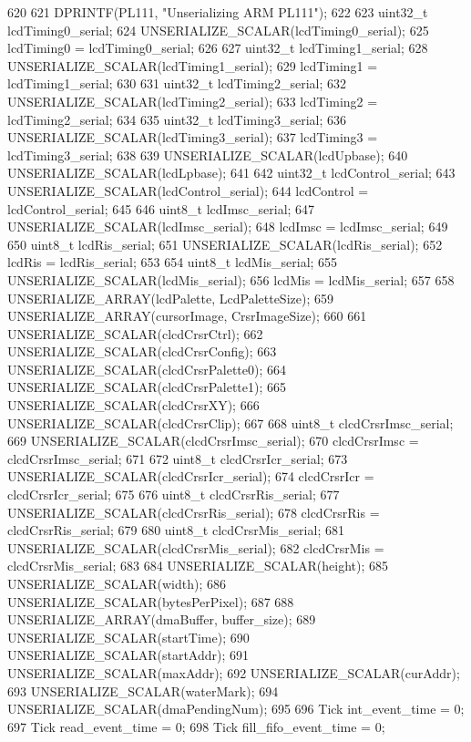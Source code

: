 \begin{DoxyCode}
620 {
621     DPRINTF(PL111, "Unserializing ARM PL111\n");
622 
623     uint32_t lcdTiming0_serial;
624     UNSERIALIZE_SCALAR(lcdTiming0_serial);
625     lcdTiming0 = lcdTiming0_serial;
626 
627     uint32_t lcdTiming1_serial;
628     UNSERIALIZE_SCALAR(lcdTiming1_serial);
629     lcdTiming1 = lcdTiming1_serial;
630 
631     uint32_t lcdTiming2_serial;
632     UNSERIALIZE_SCALAR(lcdTiming2_serial);
633     lcdTiming2 = lcdTiming2_serial;
634 
635     uint32_t lcdTiming3_serial;
636     UNSERIALIZE_SCALAR(lcdTiming3_serial);
637     lcdTiming3 = lcdTiming3_serial;
638 
639     UNSERIALIZE_SCALAR(lcdUpbase);
640     UNSERIALIZE_SCALAR(lcdLpbase);
641 
642     uint32_t lcdControl_serial;
643     UNSERIALIZE_SCALAR(lcdControl_serial);
644     lcdControl = lcdControl_serial;
645 
646     uint8_t lcdImsc_serial;
647     UNSERIALIZE_SCALAR(lcdImsc_serial);
648     lcdImsc = lcdImsc_serial;
649 
650     uint8_t lcdRis_serial;
651     UNSERIALIZE_SCALAR(lcdRis_serial);
652     lcdRis = lcdRis_serial;
653 
654     uint8_t lcdMis_serial;
655     UNSERIALIZE_SCALAR(lcdMis_serial);
656     lcdMis = lcdMis_serial;
657 
658     UNSERIALIZE_ARRAY(lcdPalette, LcdPaletteSize);
659     UNSERIALIZE_ARRAY(cursorImage, CrsrImageSize);
660 
661     UNSERIALIZE_SCALAR(clcdCrsrCtrl);
662     UNSERIALIZE_SCALAR(clcdCrsrConfig);
663     UNSERIALIZE_SCALAR(clcdCrsrPalette0);
664     UNSERIALIZE_SCALAR(clcdCrsrPalette1);
665     UNSERIALIZE_SCALAR(clcdCrsrXY);
666     UNSERIALIZE_SCALAR(clcdCrsrClip);
667 
668     uint8_t clcdCrsrImsc_serial;
669     UNSERIALIZE_SCALAR(clcdCrsrImsc_serial);
670     clcdCrsrImsc = clcdCrsrImsc_serial;
671 
672     uint8_t clcdCrsrIcr_serial;
673     UNSERIALIZE_SCALAR(clcdCrsrIcr_serial);
674     clcdCrsrIcr = clcdCrsrIcr_serial;
675 
676     uint8_t clcdCrsrRis_serial;
677     UNSERIALIZE_SCALAR(clcdCrsrRis_serial);
678     clcdCrsrRis = clcdCrsrRis_serial;
679 
680     uint8_t clcdCrsrMis_serial;
681     UNSERIALIZE_SCALAR(clcdCrsrMis_serial);
682     clcdCrsrMis = clcdCrsrMis_serial;
683 
684     UNSERIALIZE_SCALAR(height);
685     UNSERIALIZE_SCALAR(width);
686     UNSERIALIZE_SCALAR(bytesPerPixel);
687 
688     UNSERIALIZE_ARRAY(dmaBuffer, buffer_size);
689     UNSERIALIZE_SCALAR(startTime);
690     UNSERIALIZE_SCALAR(startAddr);
691     UNSERIALIZE_SCALAR(maxAddr);
692     UNSERIALIZE_SCALAR(curAddr);
693     UNSERIALIZE_SCALAR(waterMark);
694     UNSERIALIZE_SCALAR(dmaPendingNum);
695 
696     Tick int_event_time = 0;
697     Tick read_event_time = 0;
698     Tick fill_fifo_event_time = 0;
}
\end{DoxyCode}
